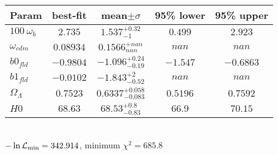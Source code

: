 \begin{tabular}{|l|c|c|c|c|} 
 \hline 
Param & best-fit & mean$\pm\sigma$ & 95\% lower & 95\% upper \\ \hline 
$100~\omega_{b }$ &$2.735$ & $1.537_{-1}^{+0.32}$ & $0.499$ & $2.923$ \\ 
$\omega_{cdm }$ &$0.08934$ & $0.1566_{nan}^{+nan}$ & $nan$ & $nan$ \\ 
$b0_{fld }$ &$-0.9804$ & $-1.096_{-0.19}^{+0.24}$ & $-1.547$ & $-0.6863$ \\ 
$b1_{fld }$ &$-0.0102$ & $-1.843_{-0.52}^{+2}$ & $nan$ & $nan$ \\ 
$\Omega_{\Lambda }$ &$0.7523$ & $0.6337_{-0.083}^{+0.058}$ & $0.5196$ & $0.7592$ \\ 
$H0$ &$68.63$ & $68.53_{-0.83}^{+0.8}$ & $66.9$ & $70.15$ \\ 
\hline 
 \end{tabular} \\ 
$-\ln{\cal L}_\mathrm{min} =342.914$, minimum $\chi^2=685.8$ \\ 
